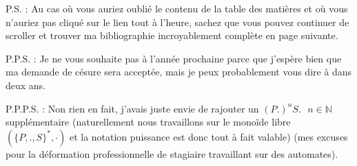 \documentclass[12pt,a4paper]{report}
\begin{document}
P.S. : Au cas où vous auriez oublié le contenu de la table des matières et où vous n'auriez pas cliqué sur le lien tout à l'heure, sachez que vous pouvez continuer de scroller et trouver ma bibliographie incroyablement complète en page suivante.

P.P.S. : Je ne vous souhaite pas à l'année prochaine parce que j'espère bien que ma demande de césure sera acceptée, mais je peux probablement vous dire à dans deux ans.

P.P.P.S. : Non rien en fait, j'avais juste envie de rajouter un $(P.)^{n}S.\text{ }n \in \mathbb{N}$ supplémentaire (naturellement nous travaillons sur le monoïde libre $(\{P,.,S\}^*,\cdot)$ et la notation puissance est donc tout à fait valable) (mes excuses pour la déformation professionnelle de stagiaire travaillant sur des automates).


\end{document}
